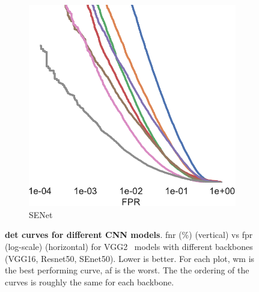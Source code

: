 \begin{figure}[h!]
\begin{subfigure}[t]{.27\linewidth}
    \includegraphics[width=.8\linewidth]{figures/curve_senet50_subgroups-crop.pdf}
    \caption{SENet~\cite{hu2018squeeze}}
    \end{subfigure}
    \caption{\textbf{\gls{det} curves for different CNN models}. \gls{fnr} (\%) (vertical) vs \gls{fpr} (log-scale)  (horizontal) for VGG2~\cite{Cao18} models with different backbones (VGG16, Resnet50, SEnet50). Lower is better. For each plot, \gls{wm} is the best performing curve, \gls{af} is the worst. The the ordering of the curves is roughly the same for each backbone.}\label{fig:sdm-appendix-a}
    \vspace{-1mm}
\end{figure}



